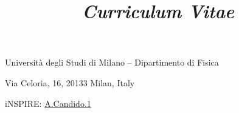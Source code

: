 \documentclass[10pt, a4paper, sans]{moderncv}
\title{\emph{Curriculum Vitae}}
\begin{document}
\makecvtitle

\vspace*{-15pt}
\begin{center}
    \color{gray}
    Università degli Studi di Milano – Dipartimento di Fisica

    Via Celoria, 16, 20133 Milan, Italy

    \emailsymbol {}
    \qquad
    \emailsymbol {}
    \qquad
    iNSPIRE: \href{https://inspirehep.net/authors/1802044}{A.Candido.1}
\end{center}
\bigskip














\nocite{*}



\clearpage
\end{document}
